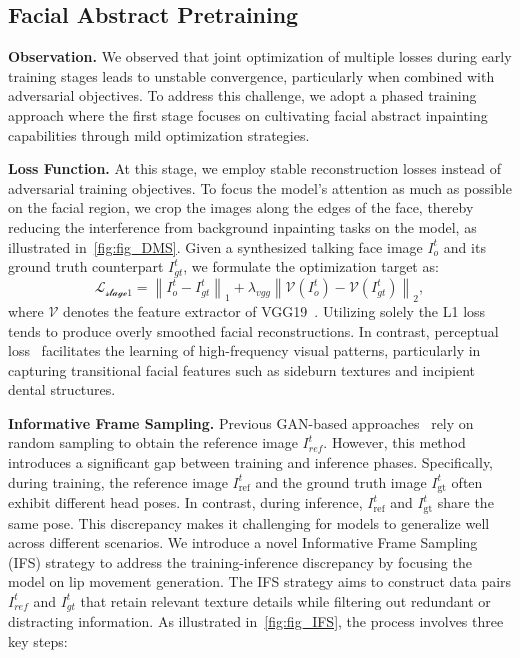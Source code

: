 \subsection{Facial Abstract Pretraining}
\label{subsec:method_3}
\noindent \textbf{Observation.} 
We observed that joint optimization of multiple losses during early training stages leads to unstable convergence, particularly when combined with adversarial objectives. 
To address this challenge, we adopt a phased training approach where the first stage focuses on cultivating facial abstract inpainting capabilities through mild optimization strategies.

\noindent \textbf{Loss Function.}
At this stage, we employ stable reconstruction losses instead of adversarial training objectives. To focus the model's attention as much as possible on the facial region, we crop the images along the edges of the face, thereby reducing the interference from background inpainting tasks on the model, as illustrated in~\cref{fig:fig_DMS}. Given a synthesized talking face image $I^{t}_{o}$ and its ground truth counterpart $I^{t}_{gt}$, we formulate the optimization target as:
\begin{equation}
\mathcal{L_{\text{stage1}}} = \left \| I^{t}_{o} - I^{t}_{gt} \right \|_1 + \lambda_{vgg} \left \| \mathcal{V}(I^{t}_{o}) - \mathcal{V}(I^{t}_{gt}) \right \|_2,
\label{loss:stage1}
\end{equation}
where $\mathcal{V}$ denotes the feature extractor of VGG19~\cite{simonyan2014very}. 
Utilizing solely the L1 loss tends to produce overly smoothed facial reconstructions. 
In contrast, perceptual loss~\cite{johnson2016perceptual} facilitates the learning of high-frequency visual patterns, particularly in capturing transitional facial features such as sideburn textures and incipient dental structures. 

\noindent \textbf{Informative Frame Sampling.} 
Previous GAN-based approaches~\cite{prajwal2020lip, zhang2023dinet, cheng2022videoretalking} rely on random sampling to obtain the reference image \(I^{t}_{ref}\). 
However, this method introduces a significant gap between training and inference phases. 
Specifically, during training, the reference image \(I^{t}_{\text{ref}}\) and the ground truth image \(I^{t}_{\text{gt}}\) often exhibit different head poses. In contrast, during inference, \(I^{t}_{\text{ref}}\) and \(I^{t}_{\text{gt}}\) share the same pose.
This discrepancy makes it challenging for models to generalize well across different scenarios. 
We introduce a novel Informative Frame Sampling (IFS) strategy to address the training-inference discrepancy by focusing the model on lip movement generation.
The IFS strategy aims to construct data pairs \(I^{t}_{ref}\) and \(I^{t}_{gt}\) that retain relevant texture details while filtering out redundant or distracting information. As illustrated in~\cref{fig:fig_IFS}, the process involves three key steps:

